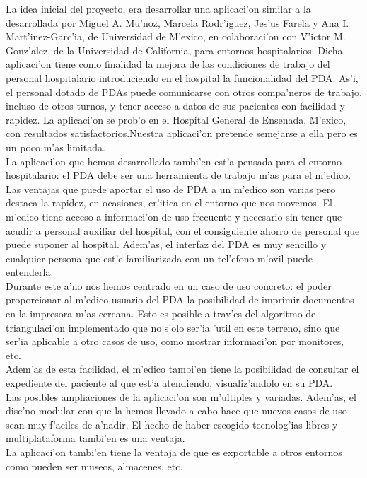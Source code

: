 La idea inicial del proyecto, era desarrollar una aplicaci'on similar a la desarrollada por Miguel A. Mu'noz, Marcela Rodr'iguez, Jes'us Farela y Ana I. Mart'inez-Garc'ia, de Universidad de M'exico, en colaboraci'on con V'ictor M. Gonz'alez, de la Universidad de California, para entornos hospitalarios. Dicha aplicaci'on tiene como finalidad la mejora de las condiciones de trabajo del personal hospitalario introduciendo en el hospital la funcionalidad del PDA. As'i, el personal dotado de PDAs puede comunicarse con otros compa'neros de trabajo, incluso de otros turnos, y tener acceso a datos de sus pacientes con facilidad y rapidez. La aplicaci'on se prob'o en  el Hospital General de Ensenada, M'exico, con resultados satisfactorios.Nuestra aplicaci'on pretende semejarse a ella pero es un poco m'as limitada. \bigskip \\ La aplicaci'on que hemos desarrollado tambi'en est'a pensada para el entorno hospitalario: el PDA debe ser una herramienta de trabajo m'as para el m'edico. Las ventajas que puede aportar el uso de PDA a un m'edico son varias pero destaca la rapidez, en ocasiones, cr'itica en el entorno que nos movemos. El m'edico tiene acceso a informaci'on de uso frecuente y necesario sin tener que acudir a personal auxiliar del hospital, con el consiguiente ahorro de personal que puede suponer al hospital. Adem'as, el interfaz del PDA es muy sencillo y cualquier persona que est'e familiarizada con un tel'efono m'ovil puede entenderla.\bigskip \\ Durante este a'no nos hemos centrado en un caso de uso concreto: el poder proporcionar al m'edico usuario del PDA la posibilidad de imprimir documentos en la impresora m'as cercana. Esto es posible a trav'es del algoritmo de triangulaci'on implementado que no s'olo ser'ia 'util en este terreno, sino que ser'ia aplicable a otro casos de uso, como mostrar informaci'on por monitores, etc.\bigskip \\ Adem'as de esta facilidad, el m'edico tambi'en tiene la posibilidad de consultar el expediente del paciente al que est'a atendiendo, visualiz'andolo en su PDA.\bigskip \\ Las posibles ampliaciones de la aplicaci'on son m'ultiples y variadas. Adem'as, el dise'no modular con que la hemos llevado a cabo hace que nuevos casos de uso sean muy f'aciles de a'nadir. El hecho de haber escogido tecnolog'ias libres y multiplataforma tambi'en es una ventaja.\bigskip \\ La aplicaci'on tambi'en tiene la ventaja de que es exportable a otros entornos como pueden  ser museos, almacenes, etc.